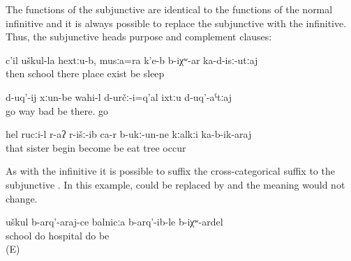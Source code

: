 The functions of the subjunctive are identical to the functions of the normal infinitive and it is always possible to replace the subjunctive with the infinitive. Thus, the subjunctive heads purpose and complement clauses:
%
\begin{exe}
	\ex	\label{ex:‎Then there at the school, there is a place, if it still exists, for you to sleep}
	\gll	c'il	uškul-la		hextːu-b,		musːa=ra		k'e-b b-iχʷ-ar				ka-d-isː-utːaj	\\
		then	school	there	place	exist		be	sleep\\
	\glt	{}

	\ex	\label{ex:‎The roads to go there were probably bad, for you to go}
	\gll	d-uq'-ij	xːun-be	wahi-l	d-určː-i=q'al	ixtːu	d-uq'-aˁtːaj\\
		go	way	bad	be	there.	go\\
	\glt	{}

	\ex	\label{ex:‎The sister started to eat up the tree so it would come down}
	\gll	hel	rucːi-l	r-aʔ	r-išː-ib	ca-r	b-ukː-un-ne	kːalkːi	ka-b-ik-araj\\
		that	sister	\tsc{f-}begin	become	be	eat	tree	occur\\
	\glt	{}
\end{exe}

As with the infinitive it is possible to suffix the cross-categorical suffix  to the subjunctive . In this example,  could be replaced by  and the meaning would not change.
%
\begin{exe}
	\ex	\label{ex:‎It would be better to build a hospital instead of building a school}
	\gll	uškul	b-arq'-araj-ce	balnicːa	b-arq'-ib-le	b-iχʷ-ardel\\
		school	do	hospital	do	be\\
	\glt	{} (E)
\end{exe}

